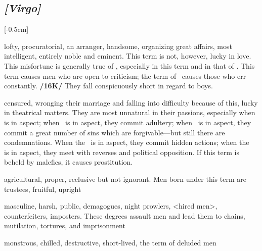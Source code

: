 \subsection{\textit{[Virgo]}}
\marginnote{\Virgo}[-0.5cm]
\vspace{-1mm}
\begin{description}[labelindent=0em , labelwidth=1em, labelsep=1em, leftmargin =!]
\item[\Mercury]
	[0-6] lofty, procuratorial, an arranger, handsome, organizing great affairs, most intelligent, entirely noble and eminent. This term is not, however, lucky in love. This
misfortune is generally true of \Virgo, especially in this term and in that of \Venus. This term causes men who are open to criticism; the term of \Venus\, causes those who err constantly. \textbf{/16K/} They fall conspicuously short in regard to boys.
\item[	\Venus]
	[7-16] censured, wronging their marriage and falling into difficulty because of this, lucky in theatrical matters. They are most unnatural in their passions, especially when \Saturn\, is in aspect; when \Mercury\, is in aspect, they commit adultery; when \Jupiter\, is in aspect, they commit a great number of sins which are forgivable—but still there are condemnations. When the \Sun\, is in aspect, they commit hidden actions; when the \Moon\, is in aspect, they meet with reverses and political opposition. If this term is beheld by malefics, it causes prostitution.
\item[\Jupiter]
	[17-20] agricultural, proper, reclusive but not ignorant. Men born under this term are trustees, fruitful, upright
\item[\Mars]
	[21-27] masculine, harsh, public,
demagogues, night prowlers, <hired men>, counterfeiters, imposters. These degrees assault men and lead them to chains, mutilation, tortures, and imprisonment	
\item[\Saturn]
	[28-29] monstrous, chilled, destructive, short-lived, the term of deluded men
\end{description}

